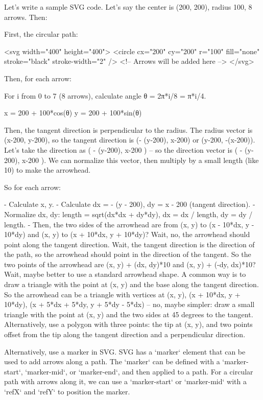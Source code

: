 Let's write a sample SVG code. Let's say the center is (200, 200), radius 100, 8 arrows. Then:

First, the circular path:

<svg width="400" height="400">
  <circle cx="200" cy="200" r="100" fill="none" stroke="black" stroke-width="2" />
  <!-- Arrows will be added here -->
</svg>

Then, for each arrow:

For i from 0 to 7 (8 arrows), calculate angle θ = 2π*i/8 = π*i/4.

x = 200 + 100*cos(θ)
y = 200 + 100*sin(θ)

Then, the tangent direction is perpendicular to the radius. The radius vector is (x-200, y-200), so the tangent direction is (- (y-200), x-200) or (y-200, -(x-200)). Let's take the direction as ( - (y-200), x-200 ) – so the direction vector is ( - (y-200), x-200 ). We can normalize this vector, then multiply by a small length (like 10) to make the arrowhead.

So for each arrow:

- Calculate x, y.
- Calculate dx = - (y - 200), dy = x - 200 (tangent direction).
- Normalize dx, dy: length = sqrt(dx*dx + dy*dy), dx = dx / length, dy = dy / length.
- Then, the two sides of the arrowhead are from (x, y) to (x - 10*dx, y - 10*dy) and (x, y) to (x + 10*dx, y + 10*dy)? Wait, no, the arrowhead should point along the tangent direction. Wait, the tangent direction is the direction of the path, so the arrowhead should point in the direction of the tangent. So the two points of the arrowhead are (x, y) + (dx, dy)*10 and (x, y) + (-dy, dx)*10? Wait, maybe better to use a standard arrowhead shape. A common way is to draw a triangle with the point at (x, y) and the base along the tangent direction. So the arrowhead can be a triangle with vertices at (x, y), (x + 10*dx, y + 10*dy), (x + 5*dx + 5*dy, y + 5*dy - 5*dx) – no, maybe simpler: draw a small triangle with the point at (x, y) and the two sides at 45 degrees to the tangent. Alternatively, use a polygon with three points: the tip at (x, y), and two points offset from the tip along the tangent direction and a perpendicular direction.

Alternatively, use a marker in SVG. SVG has a `marker` element that can be used to add arrows along a path. The `marker` can be defined with a `marker-start`, `marker-mid`, or `marker-end`, and then applied to a path. For a circular path with arrows along it, we can use a `marker-start` or `marker-mid` with a `refX` and `refY` to position the marker.

